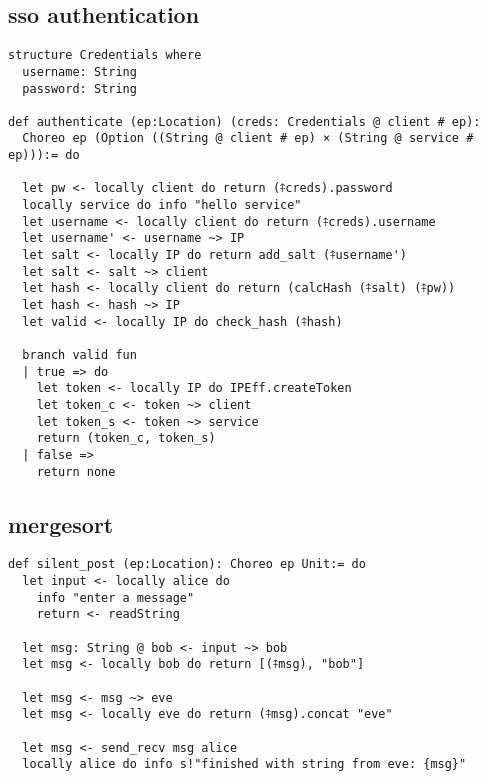 \subsection{sso authentication}
\label{ss:sso}

\begin{lstlisting}[language=lean]
structure Credentials where
  username: String
  password: String

def authenticate (ep:Location) (creds: Credentials @ client # ep):
  Choreo ep (Option ((String @ client # ep) × (String @ service # ep))):= do

  let pw <- locally client do return (⤉creds).password
  locally service do info "hello service"
  let username <- locally client do return (⤉creds).username
  let username' <- username ~> IP
  let salt <- locally IP do return add_salt (⤉username')
  let salt <- salt ~> client
  let hash <- locally client do return (calcHash (⤉salt) (⤉pw))
  let hash <- hash ~> IP
  let valid <- locally IP do check_hash (⤉hash)

  branch valid fun
  | true => do
    let token <- locally IP do IPEff.createToken
    let token_c <- token ~> client
    let token_s <- token ~> service
    return (token_c, token_s)
  | false =>
    return none
\end{lstlisting}

\subsection{mergesort}
\label{ss:merge}

\begin{lstlisting}[language=lean]
def silent_post (ep:Location): Choreo ep Unit:= do
  let input <- locally alice do
    info "enter a message"
    return <- readString

  let msg: String @ bob <- input ~> bob
  let msg <- locally bob do return [(⤉msg), "bob"]

  let msg <- msg ~> eve
  let msg <- locally eve do return (⤉msg).concat "eve"

  let msg <- send_recv msg alice
  locally alice do info s!"finished with string from eve: {msg}"
\end{lstlisting}
